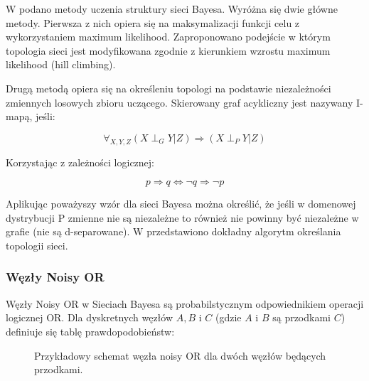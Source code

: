 \documentclass{article}
\begin{document}
W \cite{PhD} podano metody uczenia struktury sieci Bayesa. Wyróżna się dwie główne metody. Pierwsza z nich opiera się na maksymalizacji funkcji celu z wykorzystaniem maximum likelihood. Zaproponowano podejście w którym topologia sieci jest modyfikowana zgodnie z kierunkiem wzrostu maximum likelihood (hill climbing).

Drugą metodą opiera się na określeniu topologi na podstawie niezależności zmiennych losowych zbioru uczącego. Skierowany graf acykliczny jest nazywany I-mapą, jeśli:

\begin{equation}
	\forall_{X, Y, Z} (X \perp_G Y| Z) 	\Rightarrow  (X \perp_P Y | Z)
\end{equation}

Korzystając z zależności logicznej:

\begin{equation}
	p \Rightarrow q \Leftrightarrow \neg q \Rightarrow \neg p
\end{equation}

Aplikując poważyszy wzór dla sieci Bayesa można określić, że jeśli w domenowej dystrybucji P zmienne nie są niezależne to również nie powinny być niezależne w grafie (nie są d-separowane). W \cite{PhD} przedstawiono dokładny algorytm określania topologii sieci.

\subsubsection{Węzły Noisy OR}

Węzły Noisy OR w Sieciach Bayesa są probabilstycznym odpowiednikiem operacji logicznej OR. Dla dyskretnych węzłów $A, B$ i $C$ (gdzie $A$ i $B$ są przodkami $C$) definiuje się tablę prawdopodobieństw:

\begin{figure}[H]
\centering
{}
\caption{Przykładowy schemat węzła noisy OR dla dwóch węzłów będących przodkami.}
\end{figure}
\end{document}
